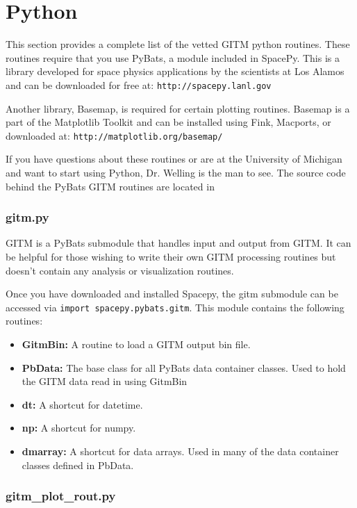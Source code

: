 \section{Python}
\label{python.sec}

This section provides a complete list of the vetted GITM python routines.  These routines require that you use PyBats, a module included in SpacePy.  This is a library developed for space physics applications by the scientists at Los Alamos and can be downloaded for free at: 
{\tt http://spacepy.lanl.gov}

Another library, Basemap, is required for certain plotting routines.  Basemap is a part of the Matplotlib Toolkit and can be installed using Fink, Macports, or downloaded at:
{\tt http://matplotlib.org/basemap/}

If you have questions about these routines or are at the University of Michigan and want to start using Python, Dr. Welling is the man to see.  The source code behind the PyBats GITM routines are located in

\subsubsection{gitm.py}

GITM is a PyBats submodule that handles input and output from GITM.  It can be helpful for those wishing to write their own GITM processing routines but doesn't contain any analysis or visualization routines. 

Once you have downloaded and installed Spacepy, the gitm submodule can be accessed via {\tt import spacepy.pybats.gitm}.  This module contains the following routines:

\begin{itemize}
\item[]{\bf GitmBin: } A routine to load a GITM output bin file.
\item[]{\bf PbData: } The base class for all PyBats data container classes.  Used to hold the GITM data read in using GitmBin
\item[]{\bf dt: } A shortcut for datetime.
\item[]{\bf np: } A shortcut for numpy.
\item[]{\bf dmarray: } A shortcut for data arrays.  Used in many of the data container classes defined in PbData.
\end{itemize}

\subsubsection{gitm\_plot\_rout.py}

